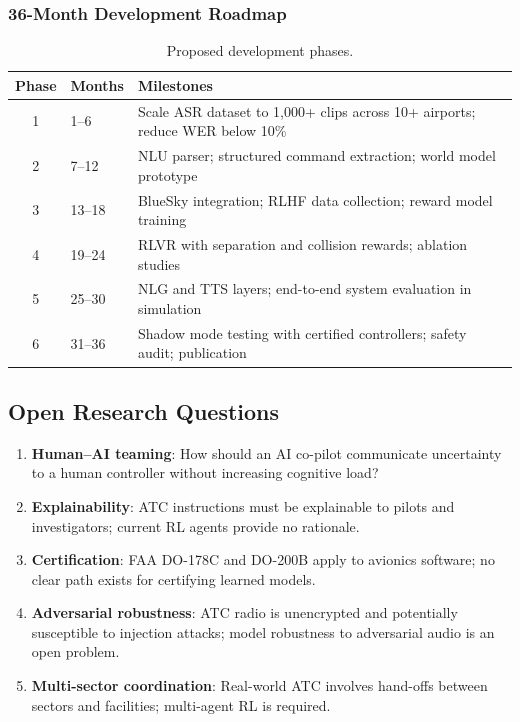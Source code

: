 \documentclass[11pt,a4paper]{article}
\begin{document}
\subsubsection{36-Month Development Roadmap}

\begin{table}[h]
\centering
\caption{Proposed development phases.}
\begin{tabular}{clp{7.5cm}}
\toprule
\textbf{Phase} & \textbf{Months} & \textbf{Milestones} \\
\midrule
1 & 1--6   & Scale ASR dataset to 1,000+ clips across 10+ airports;
              reduce WER below 10\% \\
2 & 7--12  & NLU parser; structured command extraction; world model prototype \\
3 & 13--18 & BlueSky integration; RLHF data collection;
              reward model training \\
4 & 19--24 & RLVR with separation and collision rewards;
              ablation studies \\
5 & 25--30 & NLG and TTS layers; end-to-end system evaluation in simulation \\
6 & 31--36 & Shadow mode testing with certified controllers;
              safety audit; publication \\
\bottomrule
\end{tabular}
\end{table}

\subsection{Open Research Questions}

\begin{enumerate}
  \item \textbf{Human--AI teaming}: How should an AI co-pilot communicate
        uncertainty to a human controller without increasing cognitive load?
  \item \textbf{Explainability}: ATC instructions must be explainable to pilots
        and investigators; current RL agents provide no rationale.
  \item \textbf{Certification}: FAA DO-178C and DO-200B apply to avionics
        software; no clear path exists for certifying learned models.
  \item \textbf{Adversarial robustness}: ATC radio is unencrypted and
        potentially susceptible to injection attacks; model robustness to
        adversarial audio is an open problem.
  \item \textbf{Multi-sector coordination}: Real-world ATC involves
        hand-offs between sectors and facilities; multi-agent RL is required.
\end{enumerate}
\end{document}
